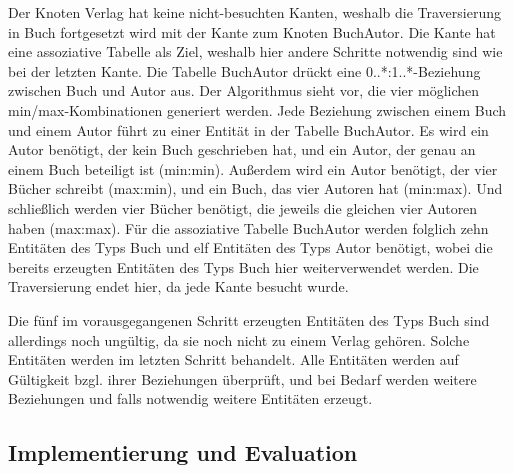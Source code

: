   Der Knoten Verlag hat keine nicht-besuchten Kanten, weshalb die Traversierung in Buch fortgesetzt wird mit der Kante zum Knoten
	BuchAutor. Die Kante hat eine assoziative Tabelle als Ziel, weshalb hier andere Schritte notwendig sind wie bei der letzten Kante.
	Die Tabelle BuchAutor drückt eine 0..*:1..*-Beziehung zwischen Buch und Autor aus. Der Algorithmus sieht vor, die vier möglichen
	min/max-Kombinationen generiert werden. Jede Beziehung zwischen einem Buch und einem Autor führt zu einer Entität in der Tabelle
	BuchAutor. Es wird ein Autor benötigt, der kein Buch geschrieben hat, und ein Autor, der genau an einem
	Buch beteiligt ist (min:min). Außerdem wird ein Autor benötigt, der vier Bücher schreibt (max:min), und ein Buch, das vier Autoren
	hat (min:max). Und schließlich werden vier Bücher benötigt, die jeweils die gleichen vier Autoren haben (max:max). Für die assoziative
	Tabelle BuchAutor werden folglich zehn Entitäten des Typs Buch und elf Entitäten des Typs Autor benötigt, wobei die bereits erzeugten
	Entitäten des Typs Buch hier weiterverwendet werden. Die Traversierung endet hier, da jede Kante besucht wurde.
	
	Die fünf im vorausgegangenen Schritt erzeugten Entitäten des Typs Buch sind allerdings noch ungültig, da sie noch nicht zu einem Verlag
	gehören. Solche Entitäten werden im letzten Schritt behandelt. Alle Entitäten werden auf Gültigkeit bzgl. ihrer Beziehungen überprüft,
	und bei Bedarf werden weitere Beziehungen und falls notwendig weitere Entitäten erzeugt.
	

	\subsection{Implementierung und Evaluation}
	

